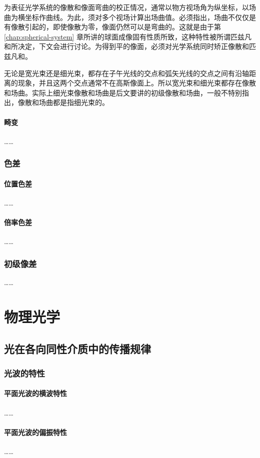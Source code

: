 \documentclass[cn,10pt,chinesefont=founder,math=mtpro2,cite=super,toc=onecol,twoside,openany]{elegantbook}
\begin{document}
为表征光学系统的像散和像面弯曲的校正情况，通常以物方视场角为纵坐标，以场曲为横坐标作曲线。为此，须对多个视场计算出场曲值。必须指出，场曲不仅仅是有像散引起的，即使像散为零，像面仍然可以是弯曲的。这就是由于第 \ref{chap:spherical-system} 章所讲的球面成像固有性质所致，这种特性被所谓匹兹凡和所决定，下文会进行讨论。为得到平的像面，必须对光学系统同时矫正像散和匹兹凡和。

无论是宽光束还是细光束，都存在子午光线的交点和弧矢光线的交点之间有沿轴距离的现象，并且这两个交点通常不在高斯像面上。所以宽光束和细光束都存在像散和场曲。实际上细光束像散和场曲是后文要讲的初级像散和场曲，一般不特别指出，像散和场曲都是指细光束的。

\subsection{畸变}
……

\section{色差}
\subsection{位置色差}
……

\subsection{倍率色差}
……

\section{初级像差}
……



\part{物理光学}

\chapter{光在各向同性介质中的传播规律}
\section{光波的特性}
\subsection{平面光波的横波特性}
……
\subsection{平面光波的偏振特性}
……
\end{document}

